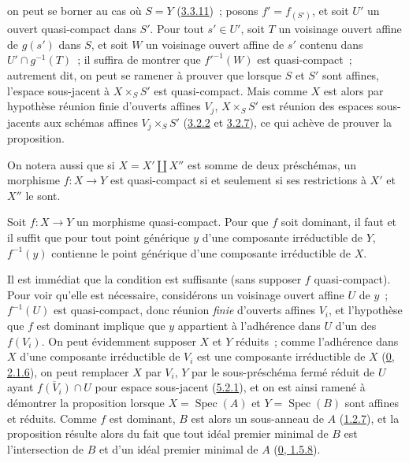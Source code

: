 on peut se borner au cas où $S=Y$ (\hyperref[I.3.3.11-fr]{3.3.11})~; posons
$f'=f_{(S')}$, et soit $U'$ un ouvert quasi-compact dans $S'$. Pour tout
$s'\in U'$, soit $T$ un voisinage ouvert affine de $g(s')$ dans $S$, et soit
$W$ un voisinage ouvert affine de $s'$ contenu dans
$U'\cap g^{-1}(T)$~; il suffira de montrer que $f'^{-1}(W)$ est
quasi-compact~; autrement dit, on peut se ramener à prouver que lorsque $S$
et $S'$ sont affines, l'espace sous-jacent à $X\times_S S'$ est
quasi-compact. Mais comme $X$ est alors par hypothèse réunion finie d'ouverts
affines $V_j$, $X\times_S S'$ est réunion des espaces sous-jacents aux
schémas affines $V_j\times_S S'$
(\hyperref[I.3.2.2-fr]{3.2.2} et \hyperref[I.3.2.7-fr]{3.2.7}), ce qui achève
de prouver la proposition.

On notera aussi que si $X=X'\amalg X''$ est somme de deux préschémas, un
morphisme $f:X\to Y$ est quasi-compact si et seulement si ses restrictions à
$X'$ et $X''$ le sont.

\begin{proposition}[6.6.5]
\label{I.6.6.5-fr}
Soit $f:X\to Y$ un morphisme quasi-compact. Pour que $f$ soit dominant, il
faut et il suffit que pour tout point générique $y$ d'une composante
irréductible de $Y$, $f^{-1}(y)$ contienne le point générique d'une composante
irréductible de $X$.
\end{proposition}

Il est immédiat que la condition est suffisante (sans supposer $f$
quasi-compact). Pour voir qu'elle est nécessaire, considérons un voisinage
ouvert affine $U$ de $y$~; $f^{-1}(U)$ est quasi-compact, donc réunion
\emph{finie} d'ouverts affines $V_i$, et l'hypothèse que $f$ est dominant
implique que $y$ appartient à l'adhérence dans $U$ d'un des $f(V_i)$. On peut
évidemment supposer $X$ et $Y$ réduits~; comme l'adhérence dans $X$ d'une
composante irréductible de $V_i$ est une composante irréductible de $X$
(\hyperref[0.2.1.6-fr]{0, 2.1.6}), on peut remplacer $X$ par $V_i$, $Y$ par
le sous-préschéma fermé réduit de $U$ ayant $\overline{f(V_i)}\cap U$ pour
espace sous-jacent (\hyperref[I.5.2.1-fr]{5.2.1}), et on est ainsi ramené à
démontrer la proposition lorsque $X=\operatorname{Spec}(A)$ et
$Y=\operatorname{Spec}(B)$ sont affines et réduits. Comme $f$ est dominant,
$B$ est alors un sous-anneau de $A$ (\hyperref[I.1.2.7-fr]{1.2.7}), et la
proposition résulte alors du fait que tout idéal premier minimal de $B$ est
l'intersection de $B$ et d'un idéal premier minimal de $A$
(\hyperref[0.1.5.8-fr]{0, 1.5.8}).

